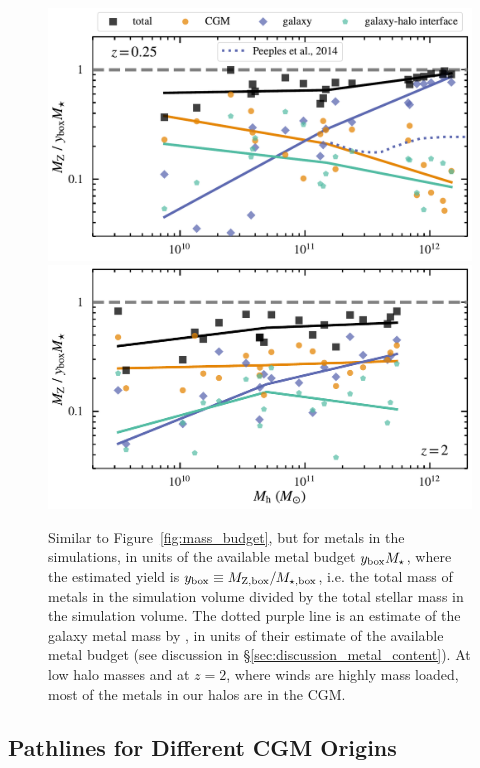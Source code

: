 \documentclass[fleqn,usenatbib]{mnras}
\begin{document}
\begin{figure}
\includegraphics[width=\columnwidth]{figures/metal_mass_budget_snum465.pdf}
\includegraphics[width=\columnwidth]{figures/metal_mass_budget_snum172.pdf}
\caption{
Similar to Figure~\ref{fig:mass_budget}, but for metals in the simulations, in units of the available metal budget $y_{\rm box} M_\star$, where the estimated yield is $y_{\rm box} \equiv M_{\rm Z, box}/M_{\rm \star, box}$, i.e. the total mass of metals in the simulation volume divided by the total stellar mass in the simulation volume.
The dotted purple line is an estimate of the galaxy metal mass by \protect\cite{Peeples2014}, in units of their estimate of the available metal budget (see discussion in \S\ref{sec:discussion_metal_content}).
At low halo masses and at $z=2$, where winds are highly mass loaded, most of the metals in our halos are in the CGM.
}
\label{fig:metal_mass_budget}
\end{figure}

\subsection{Pathlines for Different CGM Origins}
\label{sec:particle_pathlines}
\end{document}
